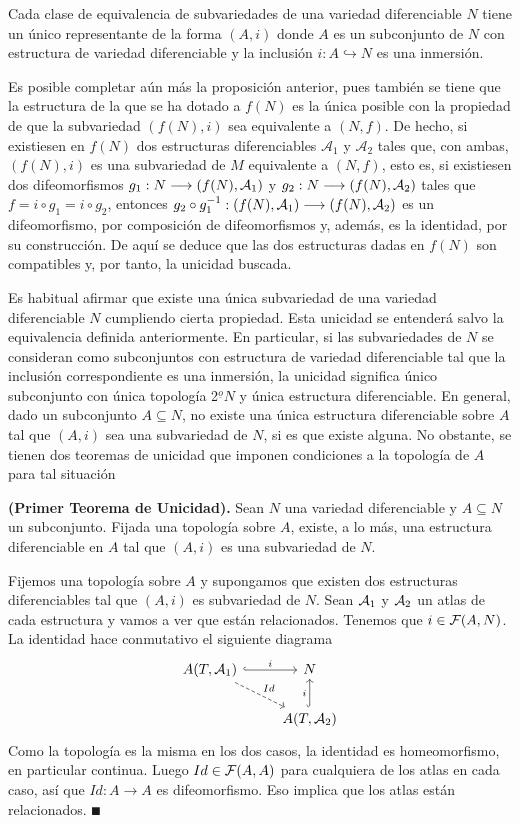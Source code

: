 \documentclass[Cursovd_portada.tex]{subfiles}
\begin{document}
\begin{prop}
Cada clase de equivalencia de subvariedades de una variedad
diferenciable $N$ tiene un único representante de la forma
$(A,i)$ donde $A$ es un subconjunto de $N$ con estructura de
variedad diferenciable y la inclusión $i:A\hookrightarrow N$
es una inmersión.
\end{prop}
\hs Es posible completar aún más la proposición
anterior, pues también se tiene que la estructura de la que se
ha dotado a $f(N)$ es la única posible con la propiedad de que
la subvariedad $(f(N),i)$ sea equivalente a $(N,f)$. De hecho, si
existiesen en $f(N)$ dos estructuras diferenciables
$\mathcal{A}_1$ y $\mathcal{A}_2$ tales que, con ambas, $(f(N),i)$
es una subvariedad de $M$ equivalente a $(N,f)$, esto es, si
existiesen dos difeomorfismos $g_1:N\longrightarrow(f(N),\mathcal{A}_1)$ y
$g_2:N\longrightarrow(f(N),\mathcal{A}_2)$ tales que $f=i\circ g_1=i\circ
g_2$, entonces $g_2\circ
g_1^{-1}:(f(N),\mathcal{A}_1)\longrightarrow(f(N),\mathcal{A}_2)$ es un
difeomorfismo, por composición de difeomorfismos y,
además, es la identidad, por su construcción. De aquí
se deduce que las dos estructuras dadas en $f(N)$ son compatibles
y, por tanto, la unicidad buscada.
\par
\hs Es habitual afirmar que existe una única subvariedad de
una variedad diferenciable $N$ cumpliendo cierta propiedad. Esta
unicidad se entenderá salvo la equivalencia definida
anteriormente. En particular, si las subvariedades de $N$ se
consideran como subconjuntos con estructura de variedad
diferenciable tal que la inclusión correspondiente es una
inmersión, la unicidad significa único subconjunto con
única topología 2$^{\underline{o}}N$ y única
estructura diferenciable. En general, dado un subconjunto
$A\subseteq N$, no existe una única estructura diferenciable
sobre $A$ tal que $(A,i)$ sea una subvariedad de $N$, si es que
existe alguna. No obstante, se tienen dos teoremas de unicidad que
imponen condiciones a la topología de $A$ para tal
situación
\begin{teorema}
{\bf (Primer Teorema de Unicidad).} Sean $N$ una variedad
diferenciable y $A\subseteq N$ un subconjunto. Fijada una
topología sobre $A$, existe, a lo más, una estructura
diferenciable en $A$ tal que $(A,i)$ es una subvariedad de $N$.
\end{teorema}
\begin{dem}
Fijemos una topología sobre $A$ y supongamos que existen dos estructuras diferenciables tal que $(A,i)$ es subvariedad de $N$. Sean $\mathcal{A}_1$ y $\mathcal{A}_2$ un atlas de cada estructura y vamos a ver que están relacionados. Tenemos que $i\in\mathcal{F}(A,N)$. La identidad hace conmutativo el siguiente diagrama
\[
\begin{tikzcd}
A (T,\calA_1)\arrow[r, hookrightarrow,  "i"]\arrow[dr, dashrightarrow, "Id"] & N\\
 & A (T,\calA_2)\arrow[u,hookrightarrow, "i"]
\end{tikzcd}
\]
Como la topología es la misma en los dos casos, la identidad es homeomorfismo, en particular continua. Luego $Id\in\mathcal{F}(A,A)$ para cualquiera de los atlas en cada caso, así que $Id:A\to A$ es difeomorfismo. Eso implica que los atlas están relacionados. $\QED$
\end{dem}
\end{document}
